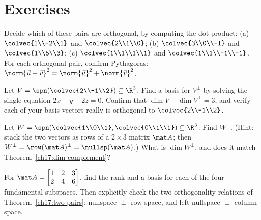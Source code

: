 \section{Exercises}

\begin{exercise}\label{ch17:ex-basic-dot}
Decide which of these pairs are orthogonal, by computing the dot product:
(a) $\colvec{1\\-2\\1}$ and $\colvec{2\\1\\0}$;\quad
(b) $\colvec{3\\0\\-1}$ and $\colvec{1\\5\\3}$;\quad
(c) $\colvec{1\\1\\1\\1}$ and $\colvec{1\\1\\-1\\-1}$.
For each orthogonal pair, confirm Pythagoras: $\norm{\vec u-\vec v}^2=\norm{\vec u}^2+\norm{\vec v}^2$.
\end{exercise}

\begin{exercise}\label{ch17:ex-complement-line}
Let $V=\spn\!\left(\colvec{2\\-1\\2}\right)\subseteq\R^3$. Find a basis for $V^\perp$ by solving the
single equation $2x-y+2z=0$. Confirm that $\dim V+\dim V^\perp=3$, and verify each of your basis
vectors really is orthogonal to $\colvec{2\\-1\\2}$.
\end{exercise}

\begin{exercise}\label{ch17:ex-complement-plane}
Let $W=\spn\!\left(\colvec{1\\0\\1},\colvec{0\\1\\1}\right)\subseteq\R^3$. Find $W^\perp$.
(Hint: stack the two vectors as rows of a $2\times3$ matrix $\mat A$; then
$W^\perp=\row(\mat A)^\perp=\nullsp(\mat A)$.) What is $\dim W^\perp$, and does it match
Theorem~\ref{ch17:dim-complement}?
\end{exercise}

\begin{exercise}\label{ch17:ex-four-spaces}
For $\mat A=\begin{bmatrix}1&2&3\\2&4&6\end{bmatrix}$, find the rank and a basis for each of the four
fundamental subspaces. Then explicitly check the two orthogonality relations of
Theorem~\ref{ch17:two-pairs}: nullspace $\perp$ row space, and left nullspace $\perp$ column space.
\end{exercise}

